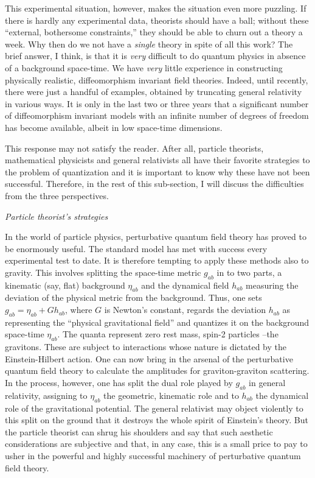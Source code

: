 This experimental situation, however, makes the situation even more
puzzling. If there is hardly any experimental data, theorists should have
a ball; without these ``external, bothersome constraints,'' they should be
able to churn
out a theory a week. Why then do we not have a {\it single} theory in spite
of all this work? The brief answer, I think, is that it is {\it very}
difficult to do quantum physics in absence of a background space-time. We have
{\it very} little experience in constructing physically realistic,
diffeomorphism invariant field theories. Indeed, until recently, there
were just a handful of examples, obtained by truncating general relativity
in various ways. It is only in the last two or three years that a significant
number of diffeomorphism invariant models with an infinite number of degrees
of freedom has become available, albeit in low space-time dimensions.

This response may not satisfy the reader. After all, particle theorists,
mathematical physicists and general relativists all have their favorite
strategies to the problem of quantization and it is important to know
why these have not been successful. Therefore, in the rest of this
sub-section, I will discuss the difficulties from the three perspectives.
\medskip

{\sl Particle theorist's strategies}

In the world of particle physics, perturbative quantum field theory has
proved to be enormously useful. The standard model has met with success
every experimental test
to date. It is therefore tempting to apply these methods also to gravity.
This involves splitting the space-time metric $g_{ab}$ in to two parts, a
kinematic (say, flat) background $\eta_{ab}$ and the dynamical field
$h_{ab}$ measuring the deviation of the physical metric from the background.
Thus, one sets $g_{ab} = \eta_{ab} + Gh_{ab}$, where $G$ is Newton's
constant, regards the deviation $h_{ab}$ as representing the ``physical
gravitational field'' and quantizes it on the background space-time
$\eta_{ab}$. The quanta represent zero rest mass, spin-2 particles
--the gravitons. These are subject to interactions whose nature is dictated
by the Einstein-Hilbert action. One can now bring in the arsenal of the
perturbative quantum field theory to calculate the amplitudes for
graviton-graviton scattering. In the process, however, one has split the
dual role played by $g_{ab}$ in general relativity, assigning to $\eta_{ab}$
the geometric, kinematic role and to $h_{ab}$ the dynamical role of the
gravitational potential. The general relativist may object violently to this
split on the ground that it destroys the whole spirit of Einstein's theory.
But the particle theorist can shrug his shoulders and say that such aesthetic
considerations are subjective and that, in any case, this is a small price to
pay to usher in the powerful and highly successful machinery of perturbative
quantum field theory.

